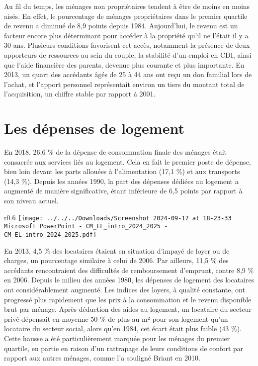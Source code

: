 \documentclass[a4paper, 12pt]{report}
\begin{document}
Au fil du temps, les ménages non propriétaires tendent à être de moins en moins aisés. En effet, le pourcentage de ménages propriétaires dans le premier quartile de revenu a diminué de 8,9 points depuis 1984. Aujourd'hui, le revenu est un facteur encore plus déterminant pour accéder à la propriété qu'il ne l'était il y a 30 ans. Plusieurs conditions favorisent cet accès, notamment la présence de deux apporteurs de ressources au sein du couple, la stabilité d'un emploi en CDI, ainsi que l'aide financière des parents, devenue plus courante et plus importante. En 2013, un quart des accédants âgés de 25 à 44 ans ont reçu un don familial lors de l'achat, et l'apport personnel représentait environ un tiers du montant total de l'acquisition, un chiffre stable par rapport à 2001.

\section{Les dépenses de logement}

En 2018, 26,6 \% de la dépense de consommation finale des ménages était consacrée aux services liés au logement. Cela en fait le premier poste de dépense, bien loin devant les parts allouées à l'alimentation (17,1 \%) et aux transports (14,3 \%). Depuis les années 1990, la part des dépenses dédiées au logement a augmenté de manière significative, étant inférieure de 6,5 points par rapport à son niveau actuel.

\begin{wrapfigure}{r}{0.6\textwidth}
	\centering
\texttt{[image: ../../../Downloads/Screenshot 2024-09-17 at 18-23-33 Microsoft PowerPoint - CM\_EL\_intro\_2024\_2025 - CM\_EL\_intro\_2024\_2025.pdf]}
\end{wrapfigure}

En 2013, 4,5 \% des locataires étaient en situation d'impayé de loyer ou de charges, un pourcentage similaire à celui de 2006. Par ailleurs, 11,5 \% des accédants rencontraient des difficultés de remboursement d'emprunt, contre 8,9 \% en 2006. Depuis le milieu des années 1980, les dépenses de logement des locataires ont considérablement augmenté. Les indices des loyers, à qualité constante, ont progressé plus rapidement que les prix à la consommation et le revenu disponible brut par ménage. Après déduction des aides au logement, un locataire du secteur privé dépensait en moyenne 50 \% de plus au m² pour son logement qu’un locataire du secteur social, alors qu’en 1984, cet écart était plus faible (43 \%). Cette hausse a été particulièrement marquée pour les ménages du premier quartile, en partie en raison d'un rattrapage de leurs conditions de confort par rapport aux autres ménages, comme l’a souligné Briant en 2010.
\end{document}
